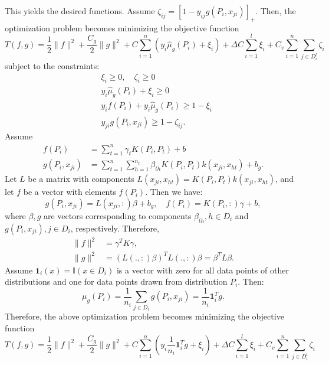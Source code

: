 \documentclass[12pt]{article}
\begin{document}
	This yields the desired functions. Assume $\zeta_{ij} = [1 - y_{ij} g(P_i, x_{ji})]_+$. Then, the optimization problem becomes minimizing the objective function
	\begin{equation}
		T(f, g) = \frac{1}{2}\|f\|^2 + \frac{C_g}{2}\|g\|^2 + C \sum_{i=1}^{n} \left( y_i \hat{\mu}_g(P_i) + \xi_i \right) + \Delta C \sum_{i=1}^{l} \xi_i + C_v \sum_{i=1}^{n} \sum_{j \in D_i^l} \zeta_i
	\end{equation}
	subject to the constraints:
	\begin{align}
		&\xi_i \ge 0, \quad \zeta_i \ge 0 \\
		&y_i \hat{\mu}_g(P_i) + \xi_i \ge 0 \\
		&y_i f(P_i) + y_i \hat{\mu}_g(P_i) \ge 1 - \xi_i \\
		&y_{ji} g(P_i, x_{ji}) \ge 1 - \zeta_{ij}.
	\end{align}
	Assume
	\begin{align}
		f(P_i) &= \sum_{t=1}^{n} \gamma_t K(P_i, P_t) + b \\
		g(P_i, x_{ji}) &= \sum_{t=1}^{n} \sum_{h=1}^{n_t} \beta_{th} K(P_i, P_t) k(x_{ji}, x_{ht}) + b_g.
	\end{align}
	Let $L$ be a matrix with components $L(x_{ji}, x_{ht}) = K(P_i, P_t) k(x_{ji}, x_{ht})$, and let $f$ be a vector with elements $f(P_i)$. Then we have:
	\begin{equation}
		g(P_i, x_{ji}) = L(x_{ji}, :) \beta + b_g, \quad f(P_i) = K(P_i, :) \gamma + b,
	\end{equation}
	where $\beta, g$ are vectors corresponding to components $\beta_{th}, h \in D_i$ and $g(P_i, x_{ji}), j \in D_i$, respectively. Therefore,
	\begin{align}
		\|f\|^2 &= \gamma^T K \gamma, \\
		\|g\|^2 &= (L(., :) \beta)^T L(., :) \beta = \beta^T L \beta.
	\end{align}
	Assume $\mathbf{1}_i(x) = \mathbb{I}(x \in D_i)$ is a vector with zero for all data points of other distributions and one for data points drawn from distribution $P_i$. Then:
	\begin{equation}
		\mu_g(P_i) = \frac{1}{n_i} \sum_{j \in D_i} g(P_i, x_{ji}) = \frac{1}{n_i} \mathbf{1}_i^T g.
	\end{equation}
	Therefore, the above optimization problem becomes minimizing the objective function
	\begin{equation}
		T(f, g) = \frac{1}{2}\|f\|^2 + \frac{C_g}{2}\|g\|^2 + C \sum_{i=1}^{n} \left( y_i \frac{1}{n_i} \mathbf{1}_i^T g + \xi_i \right) + \Delta C \sum_{i=1}^{l} \xi_i + C_v \sum_{i=1}^{n} \sum_{j \in D_i^l} \zeta_i
	\end{equation}
\end{document}
